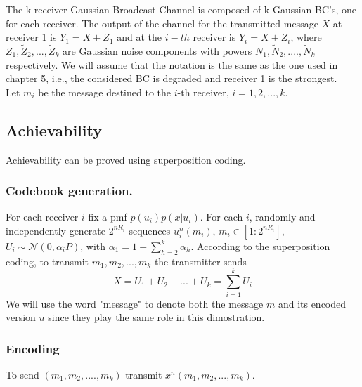 \renewcommand{\arraystretch}{2}
The k-receiver Gaussian Broadcast Channel is composed of k Gaussian BC's, one for each receiver. The output of the channel for the transmitted message $X$ at receiver 1 is $Y_1 = X+Z_1$ and at the $i-th$ receiver is $Y_i = X+Z_i$, where $Z_1,\tilde{Z}_2,...,\tilde{Z}_k$ are Gaussian noise components with powers $N_1,\tilde{N}_2,....,\tilde{N}_k$ respectively. We will assume that the notation is the same as the one used in chapter 5, i.e., the considered BC is degraded and receiver 1 is the strongest. \\
Let $m_i$ be the message destined to the $i$-th receiver, $i=1,2,...,k$.
\subsection{Achievability}
Achievability can be proved using superposition coding.
\subsubsection*{Codebook generation.}
 For each receiver $i$ fix a pmf $p(u_i)p(x|u_i)$. For each $i$, randomly and independently generate $2^{nR_i}$ sequences $u^n_i(m_i)$, $m_i\in [1:2^{nR_i}]$, $U_i\sim \mathcal{N}(0, \alpha_i P)$, with $\alpha_1 = 1-\sum_{h=2}^k \alpha_h$.
According to the superposition coding, to transmit $m_1,m_2,...,m_k$ the transmitter sends
\begin{equation}
X = U_1+ U_2+...+U_k = \sum_{i=1}^k U_i
\end{equation}
We will use the word "message" to denote both the message $m$ and its encoded version $u$ since they play the same role in this dimostration.
\subsubsection*{Encoding}
To send $(m_1,m_2,....,m_k)$ transmit $x^n(m_1,m_2, ...,m_k)$.
